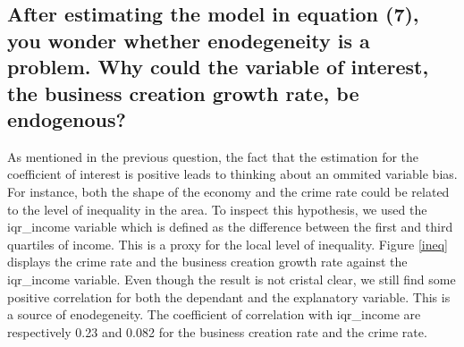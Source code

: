 \subsection{After estimating the model in equation (7), you wonder whether enodegeneity is a problem.
Why could the variable of interest, the business creation growth rate, be endogenous?}
As mentioned in the previous question, the fact that the estimation for the coefficient of interest is positive
leads to thinking about an ommited variable bias. For instance, both the shape of the economy and the crime rate could
be related to the level of inequality in the area. To inspect this hypothesis, we used the
iqr\_income variable which is defined as the difference between the first and third quartiles of income.
This is a proxy for the local level of inequality. Figure \ref{ineq} displays the crime rate and the business creation growth rate
against the iqr\_income variable. Even though the result is not cristal clear, we still find some positive correlation for both
the dependant and the explanatory variable. This is a source of enodegeneity. The coefficient of correlation with iqr\_income are respectively 0.23 and 0.082 for the business creation rate and the crime rate. 
